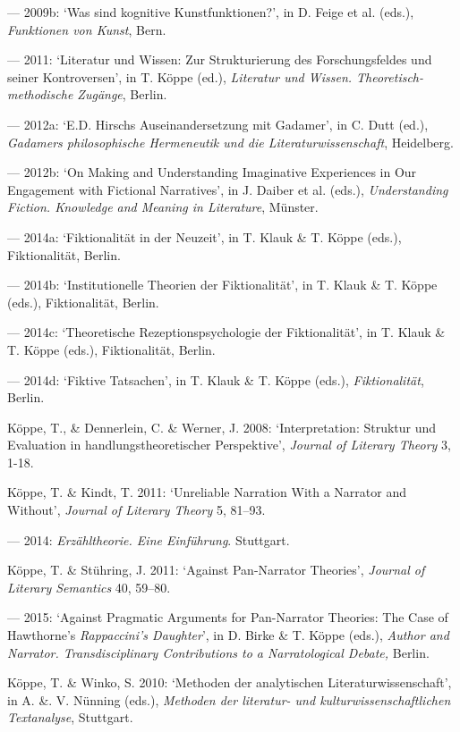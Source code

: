 \begin{hangparas}{.5cm}{1}
--- 2009b: `Was sind kognitive Kunstfunktionen?', in D. Feige et al. (eds.), \emph{Funktionen von Kunst}, Bern.

--- 2011: `Literatur und Wissen: Zur Strukturierung des Forschungsfeldes und seiner Kontroversen', in T. K\"oppe (ed.), \emph{Literatur und Wissen. Theoretisch-methodische Zug\"ange}, Berlin.

--- 2012a: `E.D. Hirschs Auseinandersetzung mit Gadamer', in C. Dutt (ed.), \emph{Gadamers philosophische Hermeneutik und die Literaturwissenschaft}, Heidelberg.

--- 2012b: `On Making and Understanding Imaginative Experiences in Our Engagement with Fictional Narratives', in J. Daiber et al. (eds.), \emph{Understanding Fiction. Knowledge and Meaning in Literature}, M\"unster.

--- 2014a: `Fiktionalit\"at in der Neuzeit', in T. Klauk \& T. K\"oppe (eds.), Fiktionalit\"at, Berlin.

--- 2014b: `Institutionelle Theorien der Fiktionalit\"at', in T. Klauk \& T. K\"oppe (eds.), Fiktionalit\"at, Berlin. 

--- 2014c: `Theoretische Rezeptionspsychologie der Fiktionalit\"at', in T. Klauk \& T. K\"oppe (eds.), Fiktionalit\"at, Berlin.

--- 2014d: `Fiktive Tatsachen', in T. Klauk \& T. K\"oppe (eds.), \emph{Fiktionalit\"at}, Berlin.

K\"oppe, T., \& Dennerlein, C. \& Werner, J. 2008: `Interpretation: Struktur und Evaluation in handlungstheoretischer Perspektive', \emph{Journal of Literary Theory} 3, 1-18.

K\"oppe, T. \& Kindt, T. 2011: `Unreliable Narration With a Narrator and Without', \emph{Journal of Literary Theory} 5, 81--93.

--- 2014: \emph{Erz\"ahltheorie. Eine Einf\"uhrung}. Stuttgart.

K\"oppe, T. \& St\"uhring, J. 2011: `Against Pan-Narrator Theories', \emph{Journal of Literary Semantics} 40, 59--80.

--- 2015: `Against Pragmatic Arguments for Pan-Narrator Theories: The Case of Hawthorne's \emph{Rappaccini's Daughter}', in D. Birke \& T. K\"oppe (eds.), \emph{Author and Narrator. Transdisciplinary Contributions to a Narratological Debate,} Berlin.

K\"oppe, T. \& Winko, S. 2010: `Methoden der analytischen Literaturwissenschaft', in A. \&. V. N\"unning (eds.), \emph{Methoden der literatur- und kulturwissenschaftlichen Textanalyse}, Stuttgart.


\end{hangparas}
